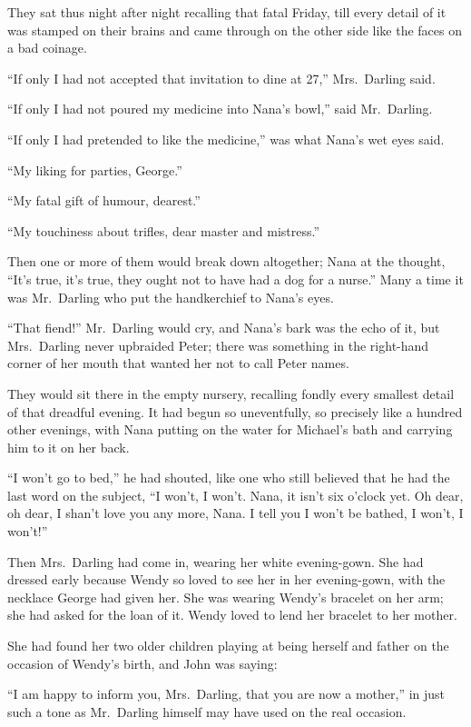 They sat thus night after night recalling that fatal Friday, till every detail
of it was stamped on their brains and came through on the other side like the
faces on a bad coinage.

``If only I had not accepted that invitation to dine at 27,'' Mrs.\ Darling
said.

``If only I had not poured my medicine into Nana's bowl,'' said Mr.\ Darling.

``If only I had pretended to like the medicine,'' was what Nana's wet eyes said.

``My liking for parties, George.''

``My fatal gift of humour, dearest.''

``My touchiness about trifles, dear master and mistress.''

Then one or more of them would break down altogether; Nana at the thought,
``It's true, it's true, they ought not to have had a dog for a nurse.'' Many a
time it was Mr.\ Darling who put the handkerchief to Nana's eyes.

``That fiend!'' Mr.\ Darling would cry, and Nana's bark was the echo of it, but
Mrs.\ Darling never upbraided Peter; there was something in the right-hand
corner of her mouth that wanted her not to call Peter names.

They would sit there in the empty nursery, recalling fondly every smallest
detail of that dreadful evening. It had begun so uneventfully, so precisely like
a hundred other evenings, with Nana putting on the water for Michael's bath and
carrying him to it on her back.

``I won't go to bed,'' he had shouted, like one who still believed that he had
the last word on the subject, ``I won't, I won't. Nana, it isn't six o'clock
yet. Oh dear, oh dear, I shan't love you any more, Nana. I tell you I won't be
bathed, I won't, I won't!''

Then Mrs.\ Darling had come in, wearing her white evening-gown. She had dressed
early because Wendy so loved to see her in her evening-gown, with the necklace
George had given her. She was wearing Wendy's bracelet on her arm; she had asked
for the loan of it. Wendy loved to lend her bracelet to her mother.

She had found her two older children playing at being herself and father on the
occasion of Wendy's birth, and John was saying:

``I am happy to inform you, Mrs.\ Darling, that you are now a mother,'' in just
such a tone as Mr.\ Darling himself may have used on the real occasion.

